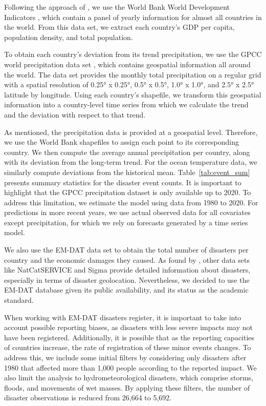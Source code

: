 Following the approach of \citet{lopez_climate_2015}, we use the World Bank World Development Indicators \citep{worldbank_wdi_2024}, which contain a panel of yearly information for almost all countries in the world. From this data set, we extract each country's GDP per capita, population density, and total population.

To obtain each country's deviation from its trend precipitation, we use the GPCC world precipitation data set \citep{gpcc_2022}, which contains geospatial information all around the world. The data set provides the monthly total precipitation on a regular grid with a spatial resolution of 0.25° x 0.25°, 0.5° x 0.5°, 1.0° x 1.0°, and 2.5° x 2.5° latitude by longitude. Using each country's shapefile, we transform this geospatial information into a country-level time series from which we calculate the trend and the deviation with respect to that trend.

As mentioned, the precipitation data is provided at a geospatial level. Therefore, we use the World Bank shapefiles to assign each point to its corresponding country. We then compute the average annual precipitation per country, along with its deviation from the long-term trend. For the ocean temperature data, we similarly compute deviations from the historical mean. Table~\ref{tab:event_sum} presents summary statistics for the disaster event counts. It is important to highlight that the GPCC precipitation dataset is only available up to 2020. To address this limitation, we estimate the model using data from 1980 to 2020. For predictions in more recent years, we use actual observed data for all covariates except precipitation, for which we rely on forecasts generated by a time series model.

We also use the EM-DAT data set \citep{cred_emdat_2024} to obtain the total number of disasters per country and the economic damages they caused. As found by \citet{Botzen2019}, other data sets like NatCatSERVICE and Sigma provide detailed information about disasters, especially in terms of disaster geolocation. Nevertheless, we decided to use the EM-DAT database given its public availability, and its status as the academic standard.

When working with EM-DAT disasters register, it is important to take into account possible reporting biases, as disasters with less severe impacts may not have been registered. Additionally, it is possible that as the reporting capacities of countries increase, the rate of registration of these minor events changes. To address this, we include some initial filters by considering only disasters after 1980 that affected more than 1,000 people according to the reported impact. We also limit the analysis to hydrometeorological disasters, which comprise storms, floods, and movements of wet masses. By applying these filters, the number of disaster observations is reduced from 26,664 to 5,692.

